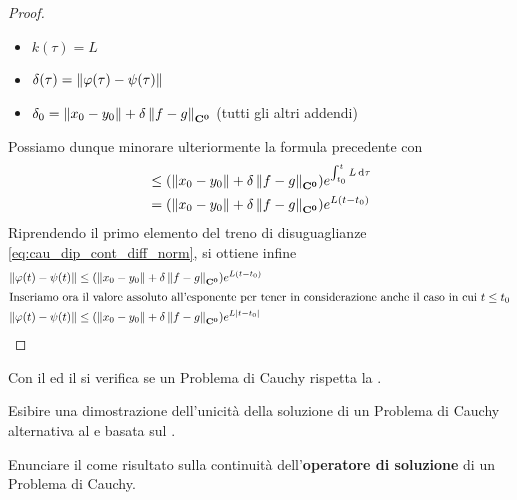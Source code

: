 \begin{theorem}
\begin{proof}
		\begin{itemize}
			\item $k(\tau) = L$
			\item $\delta(\tau) = \left\|\varphi(\tau) - \psi(\tau)\right\|$
			\item $\delta_0 = \left\|x_0 - y_0\right\| + \delta\left\|f-g\right\|_{\mathbf{C^{0}}}$ (tutti gli altri addendi)
		\end{itemize}
		Possiamo dunque minorare ulteriormente la formula precedente con
		\begin{align*}
			&\leq (\left\|x_0 - y_0\right\| + \delta\left\|f-g\right\|_{\mathbf{C^{0}}}) e^{\int_{t_0}^{t}L\,\mathrm{d}{\tau}}\\
			&= (\left\|x_0 - y_0\right\| + \delta\left\|f-g\right\|_{\mathbf{C^{0}}}) e^{L(t-t_0)}
		\end{align*}
		Riprendendo il primo elemento del treno di disuguaglianze \cref{eq:cau_dip_cont_diff_norm}, si ottiene infine
		\begin{align*}
			\left\|\varphi(t)-\psi(t)\right\| &\leq (\left\|x_0 - y_0\right\| + \delta\left\|f-g\right\|_{\mathbf{C^{0}}}) e^{L(t-t_0)}\\
			\intertext{Inseriamo ora il valore assoluto all'esponente per tener in considerazione anche il caso in cui $t \leq t_0$}
			\left\|\varphi(t)-\psi(t)\right\| &\leq (\left\|x_0 - y_0\right\| + \delta\left\|f-g\right\|_{\mathbf{C^{0}}}) e^{L\left|t-t_0\right|}
		\end{align*}
	\end{proof}
\end{theorem}
\begin{note}
	Con il  ed il  si verifica se un Problema di Cauchy rispetta la .
\end{note}
\begin{exercise}
	Esibire una dimostrazione dell'unicità della soluzione di un Problema di Cauchy alternativa al  e basata sul .
\end{exercise}
\begin{exercise}
	Enunciare il  come risultato sulla continuità dell'\textbf{operatore di soluzione} di un Problema di Cauchy.
\end{exercise}
